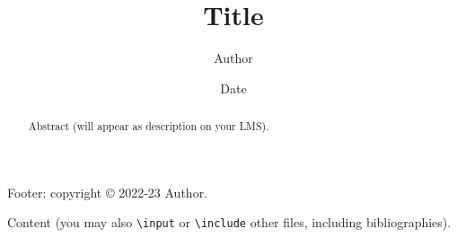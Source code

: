\documentclass[oneside,11pt]{amsart}
\title{Title}
\author{Author}
\date{Date}
\begin{document}
\begin{abstract}
  Abstract (will appear as description on your LMS).
\end{abstract}

\maketitle

\begin{lxFooter}
  Footer: copyright \copyright{} 2022-23 Author.
\end{lxFooter}

Content (you may also \texttt{\textbackslash{}input} or
\texttt{\textbackslash{}include} other files, including bibliographies).
\end{document}
